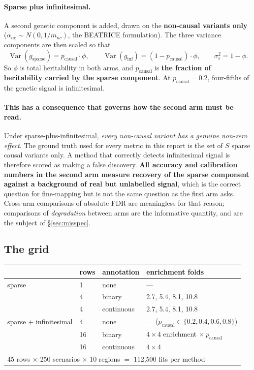 \documentclass[11pt,a4paper]{article}
\begin{document}
\paragraph{Sparse plus infinitesimal.} A second genetic component is added,
drawn on the \textbf{non-causal variants only}
($\alpha_{nc}\sim N(0,1/m_{nc})$, the BEATRICE formulation). The three variance
components are then scaled so that
\[
\operatorname{Var}(g_{\text{sparse}})=p_{\text{causal}}\cdot\phi,\qquad
\operatorname{Var}(g_{\text{inf}})=(1-p_{\text{causal}})\cdot\phi,\qquad
\sigma^2_\varepsilon=1-\phi .
\]
So $\phi$ is total heritability in both arms, and $p_{\text{causal}}$ is
\textbf{the fraction of heritability carried by the sparse component}. At
$p_{\text{causal}}=0.2$, four-fifths of the genetic signal is infinitesimal.

\paragraph{This has a consequence that governs how the second arm must be read.}
Under sparse-plus-infinitesimal, \emph{every non-causal variant has a genuine
non-zero effect}. The ground truth used for every metric in this report is the
set of $S$ sparse causal variants only. A method that correctly detects
infinitesimal signal is therefore scored as making a false discovery.
\textbf{All accuracy and calibration numbers in the second arm measure recovery
of the sparse component against a background of real but unlabelled signal},
which is the correct question for fine-mapping but is not the same question as
the first arm asks. Cross-arm comparisons of absolute FDR are meaningless for
that reason; comparisons of \emph{degradation} between arms are the informative
quantity, and are the subject of \S\ref{sec:misspec}.

\subsection{The grid}

\begin{center}\small
\begin{tabular}{llll}\toprule
& rows & annotation & enrichment folds\\\midrule
sparse & 1 & none & ---\\
& 4 & binary & 2.7, 5.4, 8.1, 10.8\\
& 4 & continuous & 2.7, 5.4, 8.1, 10.8\\
sparse + infinitesimal & 4 & none & --- \quad ($p_{\text{causal}}\in\{0.2,0.4,0.6,0.8\}$)\\
& 16 & binary & $4\times4$ enrichment $\times\ p_{\text{causal}}$\\
& 16 & continuous & $4\times4$\\\midrule
\multicolumn{4}{l}{45 rows $\times$ 250 scenarios $\times$ 10 regions $=$ 112{,}500 fits per method}\\
\bottomrule\end{tabular}\end{center}
\end{document}

